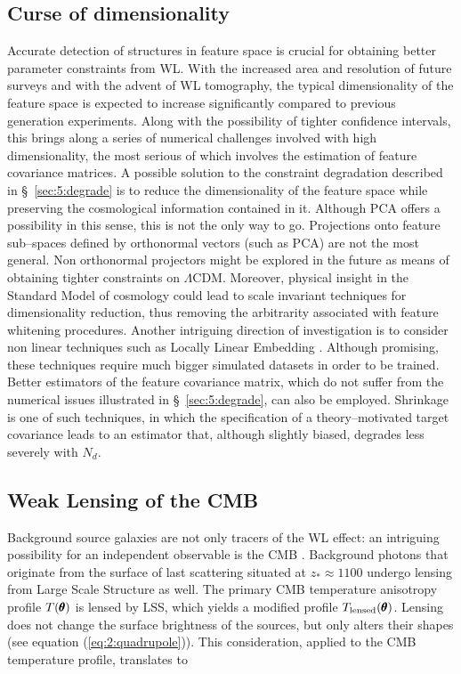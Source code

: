 \subsection{Curse of dimensionality}
Accurate detection of structures in feature space is crucial for obtaining better parameter constraints from WL. With the increased area and resolution of future surveys and with the advent of WL tomography, the typical dimensionality of the feature space is expected to increase significantly compared to previous generation experiments. Along with the possibility of tighter confidence intervals, this brings along a series of numerical challenges involved with high dimensionality, the most serious of which involves the estimation of feature covariance matrices. A possible solution to the constraint degradation described in \S~\ref{sec:5:degrade} is to reduce the dimensionality of the feature space while preserving the cosmological information contained in it. Although PCA offers a possibility in this sense, this is not the only way to go. Projections onto feature sub--spaces defined by orthonormal vectors (such as PCA) are not the most general. Non orthonormal projectors might be explored in the future as means of obtaining tighter constraints on $\Lambda$CDM. Moreover, physical insight in the Standard Model of cosmology could lead to scale invariant techniques for dimensionality reduction, thus removing the arbitrarity associated with feature whitening procedures. Another intriguing direction of investigation is to consider non linear techniques such as Locally Linear Embedding \citep{astroMLText}. Although promising, these techniques require much bigger simulated datasets in order to be trained. Better estimators of the feature covariance matrix, which do not suffer from the numerical issues illustrated in \S~\ref{sec:5:degrade}, can also be employed. Shrinkage \citep{ShrinkagePope} is one of such techniques, in which the specification of a theory--motivated target covariance leads to an estimator that, although slightly biased, degrades less severely with $N_d$.    

\subsection{Weak Lensing of the CMB}
Background source galaxies are not only tracers of the WL effect: an intriguing possibility for an independent observable is the CMB \citep{CMBLens}. Background photons that originate from the surface of last scattering situated at $z_*\approx 1100$ undergo lensing from Large Scale Structure as well. The primary CMB temperature anisotropy profile $T(\pmb{\theta})$ is lensed by LSS, which yields a modified profile $T_{\rm lensed}(\pmb{\theta})$. Lensing does not change the surface brightness of the sources, but only alters their shapes (see equation (\ref{eq:2:quadrupole})). This consideration, applied to the CMB temperature profile, translates to 

